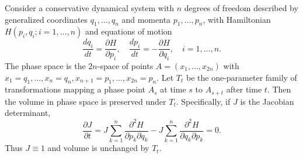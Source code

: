 Consider a conservative dynamical system with $n$ degrees of freedom described by generalized coordinates $q_1, \ldots, q_n$ and momenta $p_1, \ldots, p_n$, with Hamiltonian $H(p_i, q_i; i = 1, \ldots, n)$ and equations of motion
$$\frac{dq_i}{dt} = \frac{\partial H}{\partial p_i}, \quad \frac{dp_i}{dt} = -\frac{\partial H}{\partial q_i}, \quad i = 1, \ldots, n.$$
The phase space is the $2n$-space of points $A = (x_1, \ldots, x_{2n})$ with $x_1 = q_1, \ldots, x_n = q_n, x_{n+1} = p_1, \ldots, x_{2n} = p_n$. Let $T_t$ be the one-parameter family of transformations mapping a phase point $A_s$ at time $s$ to $A_{s+t}$ after time $t$. Then the volume in phase space is preserved under $T_t$. Specifically, if $J$ is the Jacobian determinant,
$$\frac{\partial J}{\partial t} = J \sum_{k=1}^{n} \frac{\partial^2 H}{\partial p_k \partial q_k} - J \sum_{k=1}^{n} \frac{\partial^2 H}{\partial q_k \partial p_k} = 0.$$
Thus $J \equiv 1$ and volume is unchanged by $T_t$.
